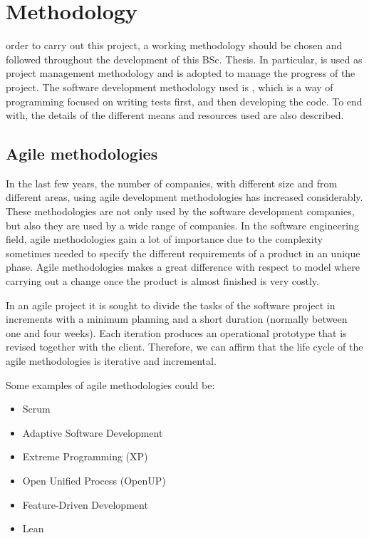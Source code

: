 \chapter{Methodology}
\label{chap:methodology}

 order to carry out this project, a working methodology should be chosen and followed throughout the development of this \ac{BSc.} Thesis. In particular,  is used as project management methodology and  is adopted to manage the progress of the project. The software development methodology used is , which is a way of programming focused on writing tests first, and then developing the code. To end with, the details of the different means and resources used are also described.


\section{Agile methodologies}

In the last few years, the number of companies, with different size and from different areas, using agile development methodologies has increased considerably. These methodologies are not only used by the software development companies, but also they are used by a wide range of companies. In the software engineering field, agile methodologies gain a lot of importance due to the complexity sometimes needed to specify the different requirements of a product in an unique phase. Agile methodologies makes a great difference with respect to  model where carrying out a change once the product is almost finished is very costly.

In an agile project it is sought to divide the tasks of the software project in increments with a minimum planning and a short duration (normally between one and four weeks). Each iteration produces an operational prototype that is revised together with the client. Therefore, we can affirm that the life cycle of the agile methodologies is iterative and incremental.

Some examples of agile methodologies could be:
\begin{multicols}{2}
	\begin{itemize}
		\item Scrum \cite{ScrumGuide}
		\item Adaptive Software Development \\ \cite{ASD}
		\item Extreme Programming (XP) \cite{XPProgramming}
		\item Open Unified Process (OpenUP) \\ \cite{Bal07}
		\item Feature-Driven Development \cite{FDD}
		\item Lean \cite{PP03}
	\end{itemize}
\end{multicols}

